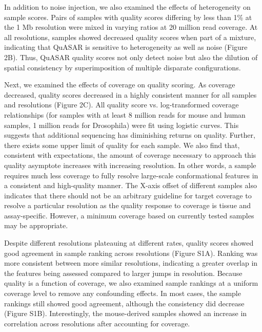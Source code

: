 In addition to noise injection, we also examined the effects of heterogeneity on sample scores. Pairs of samples with quality scores differing by less than 1\% at the 1 Mb resolution were mixed in varying ratios at 20 million read coverage. At all resolutions, samples showed decreased quality scores when part of a mixture, indicating that QuASAR is sensitive to heterogeneity as well as noise (Figure 2B). Thus, QuASAR quality scores not only detect noise but also the dilution of spatial consistency by superimposition of multiple disparate configurations.

Next, we examined the effects of coverage on quality scoring. As coverage decreased, quality scores decreased in a highly consistent manner for all samples and resolutions (Figure 2C). All quality score vs. log-transformed coverage relationships (for samples with at least 8 million reads for mouse and human samples, 1 million reads for Drosophila) were fit using logistic curves. This suggests that additional sequencing has diminishing returns on quality. Further, there exists some upper limit of quality for each sample. We also find that, consistent with expectations, the amount of coverage necessary to approach this quality asymptote increases with increasing resolution. In other words, a sample requires much less coverage to fully resolve large-scale conformational features in a consistent and high-quality manner. The X-axis offset of different samples also indicates that there should not be an arbitrary guideline for target coverage to resolve a particular resolution as the quality response to coverage is tissue and assay-specific. However, a minimum coverage based on currently tested samples may be appropriate.

Despite different resolutions plateauing at different rates, quality scores showed good agreement in sample ranking across resolutions (Figure S1A). Ranking was more consistent between more similar resolutions, indicating a greater overlap in the features being assessed compared to larger jumps in resolution. Because quality is a function of coverage, we also examined sample rankings at a uniform coverage level to remove any confounding effects. In most cases, the sample rankings still showed good agreement, although the consistency did decrease (Figure S1B). Interestingly, the mouse-derived samples showed an increase in correlation across resolutions after accounting for coverage.

